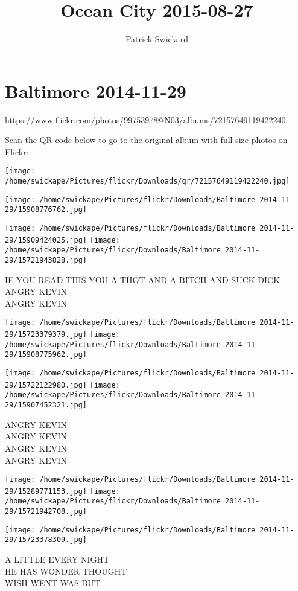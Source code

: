 \documentclass[10pt,letterpaper]{article}
\title{Ocean City 2015-08-27}
\author{Patrick Swickard}
\date{}
\begin{document}
\section*{Baltimore 2014-11-29}

\url{https://www.flickr.com/photos/99753978@N03/albums/72157649119422240}

Scan the QR code below to go to the original album with full-size photos on Flickr:

\texttt{[image: /home/swickape/Pictures/flickr/Downloads/qr/72157649119422240.jpg]}
\pagebreak

\texttt{[image: /home/swickape/Pictures/flickr/Downloads/Baltimore 2014-11-29/15908776762.jpg]}

\vspace{0.25in}
\texttt{[image: /home/swickape/Pictures/flickr/Downloads/Baltimore 2014-11-29/15909424025.jpg]}
\texttt{[image: /home/swickape/Pictures/flickr/Downloads/Baltimore 2014-11-29/15721943828.jpg]}

IF YOU READ THIS YOU A THOT AND A BITCH AND SUCK DICK\\
ANGRY KEVIN\\
ANGRY KEVIN
\pagebreak

\texttt{[image: /home/swickape/Pictures/flickr/Downloads/Baltimore 2014-11-29/15723379379.jpg]}
\texttt{[image: /home/swickape/Pictures/flickr/Downloads/Baltimore 2014-11-29/15908775962.jpg]}

\texttt{[image: /home/swickape/Pictures/flickr/Downloads/Baltimore 2014-11-29/15722122980.jpg]}
\texttt{[image: /home/swickape/Pictures/flickr/Downloads/Baltimore 2014-11-29/15907452321.jpg]}

ANGRY KEVIN\\
ANGRY KEVIN\\
ANGRY KEVIN\\
ANGRY KEVIN
\pagebreak

\texttt{[image: /home/swickape/Pictures/flickr/Downloads/Baltimore 2014-11-29/15289771153.jpg]}
\texttt{[image: /home/swickape/Pictures/flickr/Downloads/Baltimore 2014-11-29/15721942708.jpg]}

\vspace{0.25in}
\texttt{[image: /home/swickape/Pictures/flickr/Downloads/Baltimore 2014-11-29/15723378309.jpg]}

A LITTLE EVERY NIGHT\\
HE HAS WONDER THOUGHT\\
WISH WENT WAS BUT
\pagebreak
\end{document}
